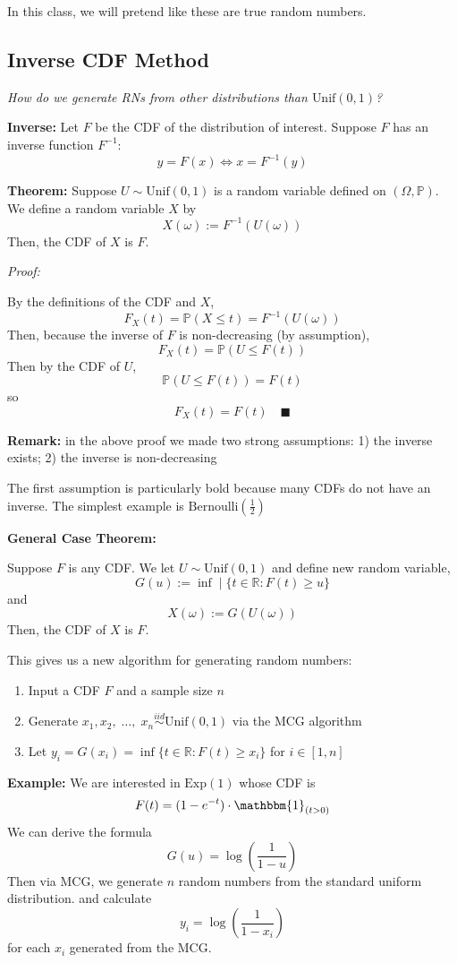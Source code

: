 \documentclass[12pt]{article}
\renewcommand{\P}{\mathbb{P}}
\newcommand{\R}{\mathbb{R}}
\newcommand{\qed}{\quad \blacksquare}
\newcommand{\ind}{\mathbbm{1}}
\newcommand{\ellipsis}{\; \dots, \;}
\begin{document}
In this class, we will pretend like these are true random numbers. 

\subsection{Inverse CDF Method}
\emph{How do we generate RNs from other distributions than $\text{Unif}(0, 1)$?}

\textbf{Inverse:} Let $F$ be the CDF of the distribution of interest. Suppose $F$ has an inverse function $F^{-1}$:
\[y = F(x) \iff x = F^{-1}(y)\]

\textbf{Theorem:} Suppose $U \sim \text{Unif}(0, 1)$ is a random variable defined on $(\Omega, \P)$. We define a random variable $X$ by 
\[X(\omega) := F^{-1}(U(\omega))\]
Then, the CDF of $X$ is $F$. 

\emph{Proof:} 

By the definitions of the CDF and $X$, 
\[F_X(t) = \P(X \leq t) = F^{-1}(U(\omega))\]
Then, because the inverse of $F$ is non-decreasing (by assumption),
\[F_X(t) = \P(U \leq F(t))\]
Then by the CDF of $U$, 
\[\P(U \leq F(t)) = F(t)\]
so 
\[F_X(t) = F(t) \qed\]

\textbf{Remark:} in the above proof we made two strong assumptions: 1) the inverse exists; 2) the inverse is non-decreasing 

The first assumption is particularly bold because many CDFs do not have an inverse. The simplest example is $\text{Bernoulli}(\frac{1}{2})$

\textbf{General Case Theorem:} 

Suppose $F$ is any CDF. We let $U \sim \text{Unif}(0, 1)$ and define new random variable,
\[G(u) := \inf\; | \;\{t \in \R: F(t) \geq u\}\]
and 
\[X(\omega) := G(U(\omega))\]
Then, the CDF of $X$ is $F$. 

This gives us a new algorithm for generating random numbers:
\begin{enumerate}
    \item Input a CDF $F$ and a sample size $n$
    \item Generate $x_1, x_2, \ellipsis x_n \overset{iid}{\sim} \text{Unif}(0, 1)$ via the MCG algorithm
    \item Let $y_i = G(x_i) = \inf\{t \in \R : F(t) \geq x_i\}$ for $i \in [1, n]$
\end{enumerate}

\textbf{Example:} We are interested in $\text{Exp}(1)$ whose CDF is 
\[F(t) = (1 - e^{-t}) \cdot \ind_{(t > 0)} \]
We can derive the formula 
\[G(u) = \log\left(\frac{1}{1 - u}\right)\]
Then via MCG, we generate $n$ random numbers from the standard uniform distribution. and calculate
\[y_i = \log\left(\frac{1}{1 - x_i}\right)\] 
for each $x_i$ generated from the MCG. 
\end{document}
